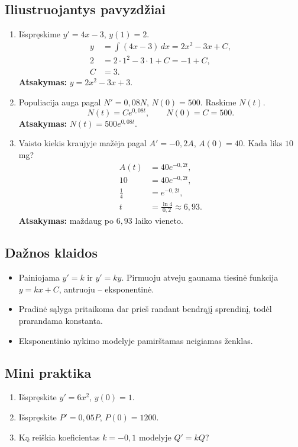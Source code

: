 \subsection{Iliustruojantys pavyzdžiai}
\begin{enumerate}[label=\arabic*.]
\item Išspręskime \(y'=4x-3\), \(y(1)=2\).
\begin{align}
y&=\int(4x-3)\,dx=2x^2-3x+C,\\
2&=2\cdot1^2-3\cdot1+C=-1+C,\\
C&=3.
\end{align}
\textbf{Atsakymas:} \(y=2x^2-3x+3\).

\item Populiacija auga pagal \(N'=0{,}08N\), \(N(0)=500\). Raskime \(N(t)\).
\[
N(t)=Ce^{0{,}08t},\qquad N(0)=C=500.
\]
\textbf{Atsakymas:} \(N(t)=500e^{0{,}08t}\).

\item Vaisto kiekis kraujyje mažėja pagal \(A'=-0{,}2A\), \(A(0)=40\). Kada liks \(10\) mg?
\begin{align}
A(t)&=40e^{-0{,}2t},\\
10&=40e^{-0{,}2t},\\
\frac14&=e^{-0{,}2t},\\
t&=\frac{\ln4}{0{,}2}\approx6{,}93.
\end{align}
\textbf{Atsakymas:} maždaug po \(6{,}93\) laiko vieneto.
\end{enumerate}

\subsection{Dažnos klaidos}
\begin{itemize}
\item Painiojama \(y'=k\) ir \(y'=ky\). Pirmuoju atveju gaunama tiesinė funkcija \(y=kx+C\), antruoju -- eksponentinė.
\item Pradinė sąlyga pritaikoma dar prieš randant bendrąjį sprendinį, todėl prarandama konstanta.
\item Eksponentinio nykimo modelyje pamirštamas neigiamas ženklas.
\end{itemize}

\subsection{Mini praktika}
\begin{enumerate}[label=\alph*)]
\item Išspręskite \(y'=6x^2\), \(y(0)=1\).
\item Išspręskite \(P'=0{,}05P\), \(P(0)=1200\).
\item Ką reiškia koeficientas \(k=-0{,}1\) modelyje \(Q'=kQ\)?
\end{enumerate}

